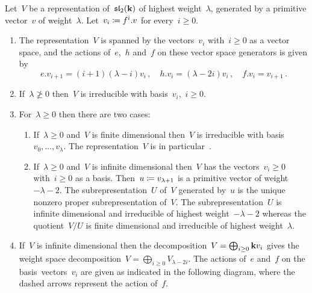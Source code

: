 \begin{theorem}
  \label{classification of highest weight for sl2}
  Let~$V$ be a representation of~$\mathfrak{sl}_2(\mathbf{k})$ of highest weight~$\lambda$, generated by a primitive vector~$v$ of weight~$\lambda$.
  Let~$v_i \coloneqq f^i.v$ for every~$i \geq 0$.
  \begin{enumerate}
    \item
      The representation~$V$ is spanned by the vectors~$v_i$ with~$i \geq 0$ as a vector space, and the actions of~$e$,~$h$ and~$f$ on these vector space generators is given by
      \[
        e.v_{i+1}
        =
        (i+1)(\lambda-i) v_i  \,,
        \quad
        h.v_i
        =
        (\lambda-2i) v_i  \,,
        \quad
        f.v_i
        =
        v_{i+1} \,.
      \]
    \item
      \label{highest weight nondominant}
      If~$\lambda \ngeq 0$ then~$V$ is irreducible with basis~$v_i$,~$i \geq 0$.
    \item
      For~$\lambda \geq 0$ then there are two cases:
      \begin{enumerate}
        \item
          If~$\lambda \geq 0$ and~$V$ is finite dimensional then~$V$ is irreducible with basis~$v_0, \dotsc, v_{\lambda}$.
          The representation~$V$ is in particular~{}.
        \item
          If~$\lambda \geq 0$ and~$V$ is infinite dimensional then~$V$ has the vectors~$v_i \geq 0$ with~$i \geq 0$ as a basis.
          Then~$u \coloneqq v_{\lambda+1}$ is a primitive vector of weight~$-\lambda-2$.
          The subrepresentation~$U$ of~$V$ generated by~$u$ is the unique nonzero proper subrepresentation of~$V$.
          The subrepresentation~$U$ is infinite dimensional and irreducible of highest weight~$-\lambda-2$ whereas the quotient~$V/U$ is finite dimensional and irreducible of highest weight~$\lambda$.
      \end{enumerate}
    \item
      If~$V$ is infinite dimensional then the decomposition~$V = \bigoplus_{i \geq 0} \mathbf{k} v_i$ gives the weight space decomposition~$V = \bigoplus_{i \geq 0} V_{\lambda-2i}$.
      The actions of~$e$ and~$f$ on the basis~vectors~$v_i$ are given as indicated in the following diagram, where the dashed arrows represent the action of~$f$.
      \begin{equation}
        \label{picture of infinite dimensional verma irrep}

\end{equation}
\end{enumerate}
\end{theorem}
